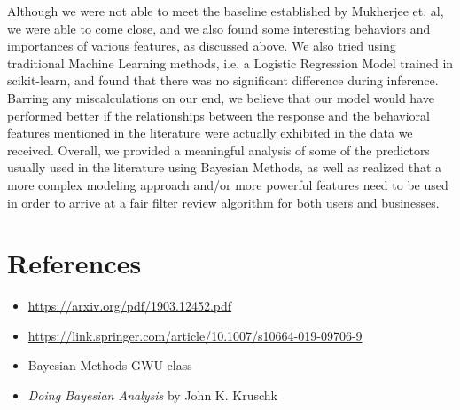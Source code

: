 \documentclass[man, floatsintext, 10pt]{apa6}
\begin{document}
Although we were not able to meet the baseline established by Mukherjee et. al, we were able to come close, and we also found some interesting behaviors and importances of various features, as discussed above. We also tried using traditional Machine Learning methods, i.e. a Logistic Regression Model trained in scikit-learn, and found that there was no significant difference during inference. Barring any miscalculations on our end, we believe that our model would have performed better if the relationships between the response and the behavioral features mentioned in the literature were actually exhibited in the data we received. Overall, we provided a meaningful analysis of some of the predictors usually used in the literature using Bayesian Methods, as well as realized that a more complex modeling approach and/or more powerful features need to be used in order to arrive at a fair filter review algorithm for both users and businesses. 

\newpage

\section{References}

\begin{itemize}
\item \url{https://arxiv.org/pdf/1903.12452.pdf}
\item \url{https://link.springer.com/article/10.1007/s10664-019-09706-9}
\item Bayesian Methods GWU class
\item \textit{Doing Bayesian Analysis} by John K. Kruschk
\end{itemize}
\end{document}
